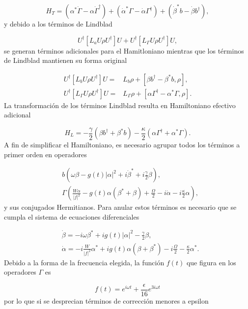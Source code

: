 \documentclass[10pt,a4paper]{report}
\begin{document}
\begin{equation}
H_{T} = (\alpha^*\dot{\Gamma} - \alpha\dot{\Gamma}^\dagger) +(\dot{\alpha}^*\Gamma - \dot{\alpha}\Gamma^\dagger) +(\dot{\beta}^*b - \dot{\beta}b^\dagger),
\end{equation} y debido a los términos de Lindblad

\begin{equation}
U^\dagger [L_aU\rho U^\dagger]U + U^\dagger [L_\Gamma U\rho U^\dagger]U,
\end{equation} se generan términos adicionales para el Hamitloniano mientras que los términos de Lindblad mantienen su forma original

\begin{align}
U^\dagger [L_bU\rho U^\dagger]U=& L_b\rho + [\beta b^\dagger - \beta^* b,\rho],\\
U^\dagger [L_\Gamma U\rho U^\dagger]U =& L_\Gamma \rho + [ \alpha \Gamma^\dagger - \alpha^* \Gamma,\rho].
\end{align} La transformación de los términos Lindblad resulta en  Hamiltoniano efectivo adicional

\begin{equation}
H_L = -\frac{\gamma}{2}(\beta b^\dagger + \beta^* b) -\frac{\kappa}{2}( \alpha \Gamma^\dagger + \alpha^* \Gamma).
\end{equation} A fin de simplificar el Hamiltoniano, es necesario agrupar todos los términos a primer orden en operadores

\begin{align}
&b(\omega\beta - g(t)|\alpha|^2 + i\dot{\beta}^* + i\frac{\gamma}{2}\beta),\\
&\Gamma(\frac{W\alpha}{|f|^2} -g(t)\alpha(\beta^*+\beta) + \frac{\Omega}{2}-i\dot{\alpha} - i\frac{\kappa}{2}\alpha),
\end{align} y sus conjugados Hermitianos. Para anular estos términos es necesario que se cumpla el sistema de ecuaciones diferenciales

\begin{align}
&\dot{\beta} = -i\omega\beta^* + ig(t)|\alpha|^2 - \frac{\gamma}{2}\beta,\\
&\dot{\alpha} = -i \frac{W}{|f|^2}\alpha^* + ig(t)\alpha(\beta + \beta^*) -i \frac{\Omega}{2} - \frac{\kappa}{2}\alpha^*.
\end{align} Debido a la forma de la frecuencia elegida, la función $f(t)$ que figura en los operadores $\Gamma$ es

\begin{equation}
f(t) = e^{i\omega t} + \frac{\epsilon}{16}e^{3i\omega t}
\end{equation} por lo que si se desprecian términos de corrección menores a epsilon
\end{document}
